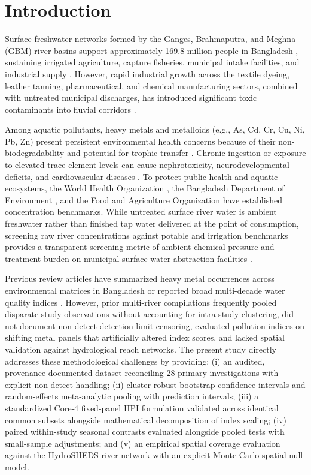 \documentclass[authoryear,preprint,12pt]{elsarticle}
\begin{document}
\linenumbers

\section{Introduction}
Surface freshwater networks formed by the Ganges, Brahmaputra, and Meghna (GBM) river basins support approximately 169.8 million people in Bangladesh \citep{BBS2022}, sustaining irrigated agriculture, capture fisheries, municipal intake facilities, and industrial supply \citep{Chowdhury2004}. However, rapid industrial growth across the textile dyeing, leather tanning, pharmaceutical, and chemical manufacturing sectors, combined with untreated municipal discharges, has introduced significant toxic contaminants into fluvial corridors \citep{Bhuiyan2015,Islam2015}.

Among aquatic pollutants, heavy metals and metalloids (e.g., As, Cd, Cr, Cu, Ni, Pb, Zn) present persistent environmental health concerns because of their non-biodegradability and potential for trophic transfer \citep{Jarup2003,Tchounwou2012}. Chronic ingestion or exposure to elevated trace element levels can cause nephrotoxicity, neurodevelopmental deficits, and cardiovascular diseases \citep{Needleman2004,Saha2017}. To protect public health and aquatic ecosystems, the World Health Organization \citep{WHO2022}, the Bangladesh Department of Environment \citep{ECR1997,ECR2023}, and the Food and Agriculture Organization \citep{FAO1985} have established concentration benchmarks. While untreated surface river water is ambient freshwater rather than finished tap water delivered at the point of consumption, screening raw river concentrations against potable and irrigation benchmarks provides a transparent screening metric of ambient chemical pressure and treatment burden on municipal surface water abstraction facilities \citep{Islam2015,Li2018}.

Previous review articles have summarized heavy metal occurrences across environmental matrices in Bangladesh \citep{Islam2018review} or reported broad multi-decade water quality indices \citep{Bilal2023,Proshad2025}. However, prior multi-river compilations frequently pooled disparate study observations without accounting for intra-study clustering, did not document non-detect detection-limit censoring, evaluated pollution indices on shifting metal panels that artificially altered index scores, and lacked spatial validation against hydrological reach networks. The present study directly addresses these methodological challenges by providing: (i) an audited, provenance-documented dataset reconciling 28 primary investigations with explicit non-detect handling; (ii) cluster-robust bootstrap confidence intervals and random-effects meta-analytic pooling with prediction intervals; (iii) a standardized Core-4 fixed-panel HPI formulation validated across identical common subsets alongside mathematical decomposition of index scaling; (iv) paired within-study seasonal contrasts evaluated alongside pooled tests with small-sample adjustments; and (v) an empirical spatial coverage evaluation against the HydroSHEDS river network with an explicit Monte Carlo spatial null model.
\end{document}
